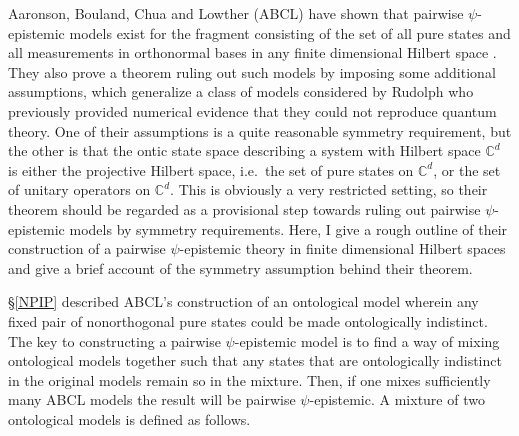 \documentclass[DIV=calc,fontsize=12pt]{scrartcl} %
\theoremstyle{definition}
\theoremstyle{plain}
\begin{document}
Aaronson, Bouland, Chua and Lowther (ABCL) have shown that pairwise
$\psi$-epistemic models exist for the fragment consisting of the set
of all pure states and all measurements in orthonormal bases in any
finite dimensional Hilbert space \cite{Aaronson2013}.  They also prove
a theorem ruling out such models by imposing some additional
assumptions, which generalize a class of models considered by Rudolph
\cite{Rudolph2006} who previously provided numerical evidence that
they could not reproduce quantum theory.  One of their assumptions is
a quite reasonable symmetry requirement, but the other is that the
ontic state space describing a system with Hilbert space
$\mathbb{C}^d$ is either the projective Hilbert space, i.e.\ the set
of pure states on $\mathbb{C}^d$, or the set of unitary operators on
$\mathbb{C}^d$.  This is obviously a very restricted setting, so their
theorem should be regarded as a provisional step towards ruling out
pairwise $\psi$-epistemic models by symmetry requirements.  Here, I
give a rough outline of their construction of a pairwise
$\psi$-epistemic theory in finite dimensional Hilbert spaces and give
a brief account of the symmetry assumption behind their theorem.

\S\ref{NPIP} described ABCL's construction of an ontological model
wherein any fixed pair of nonorthogonal pure states could be made
ontologically indistinct.  The key to constructing a pairwise
$\psi$-epistemic model is to find a way of mixing ontological models
together such that any states that are ontologically indistinct in the
original models remain so in the mixture.  Then, if one mixes
sufficiently many ABCL models the result will be pairwise
$\psi$-epistemic.  A mixture of two ontological models is defined as
follows.
\end{document}
